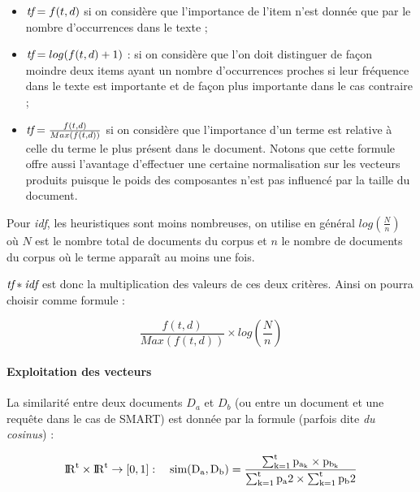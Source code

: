 \begin{itemize}
  
\item $\emph{tf} = f(t,d)$ si on considère que l'importance de l'item
  n'est donnée que par le nombre d'occurrences dans le texte ;
  
\item $\emph{tf} = log(f(t,d) + 1)$ : %
  si on
  considère que l'on doit distinguer de façon moindre deux items ayant
  un nombre d'occurrences proches si leur fréquence dans le texte est
  importante et de façon plus importante dans le cas contraire ;
  
\item $\emph{tf} = \frac{f(t,d)}{Max(f(t,d))}$ si on considère que
  l'importance d'un terme est relative à celle du terme le plus
  présent dans le document. Notons que cette formule offre aussi
  l'avantage d'effectuer une certaine normalisation sur les vecteurs
  produits puisque le poids des composantes n'est pas influencé par la
  taille du document.

\end{itemize}

Pour \emph{idf}, les heuristiques sont moins nombreuses, on utilise en
général $log(\frac{N}{n})$ où $N$ est le nombre total de documents du
corpus et $n$ le nombre de documents du corpus où le terme apparaît au
moins une fois.

$\emph{tf}*\emph{idf}$ est donc la multiplication des valeurs de ces
deux critères. Ainsi on pourra choisir comme formule :

\begin{equation}
  \label{eq:tf-idf}
  \frac{f(t,d)}{Max(f(t,d))} \times log(\frac{N}{n})
\end{equation}

\paragraph{Exploitation des vecteurs}

La similarité entre deux documents $D_a$ et $D_b$ (ou entre un
document et une requête dans le cas de SMART) est donnée par la
formule (parfois dite \emph{du cosinus}) :

\begin{equation}
  \label{eq:salton-cos}
  \rm{I \! R}^t\times\rm{I \! R}^t \rightarrow [0,1] : \quad sim(D_a, D_b) =
\frac{\sum_{k=1}^{t}p_{a_k}\times
 p_{b_k}}{\sum_{k=1}^{t}p_a2 \times \sum_{k=1}^{t}p_b2}
\end{equation}


